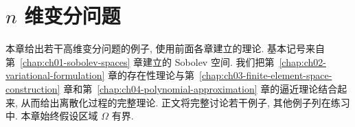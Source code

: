 \section{$n$ 维变分问题}
\label{chap:ch05-n-dimensional-variational-problems}

本章给出若干高维变分问题的例子, 使用前面各章建立的理论. 基本记号来自第~\ref{chap:ch01-sobolev-spaces} 章建立的 Sobolev 空间. 我们把第~\ref{chap:ch02-variational-formulation} 章的存在性理论与第~\ref{chap:ch03-finite-element-space-construction} 章和第~\ref{chap:ch04-polynomial-approximation} 章的逼近理论结合起来, 从而给出离散化过程的完整理论. 正文将完整讨论若干例子, 其他例子列在练习中. 本章始终假设区域 $\Omega$ 有界.











